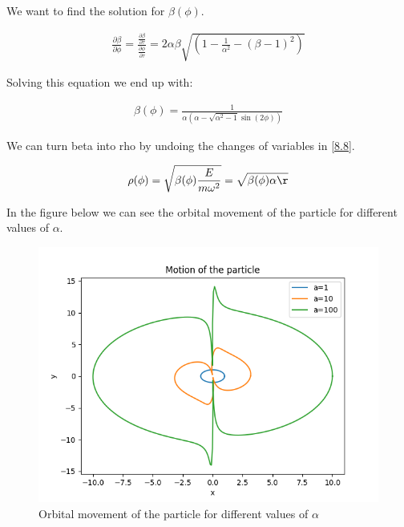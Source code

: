 We want to find the solution for $\beta (\phi)$.

\begin{equation}
  \begin{array}{c}
    \frac{\partial\beta}{\partial\phi} = \frac{\frac{\partial\beta}{\partial\tau}}{\frac{\partial\phi}{\partial\tau}} = 2\alpha\beta\sqrt{\left(1-\frac{1}{\alpha^2}-(\beta-1)^2\right)}
  \end{array}
\end{equation}

Solving this equation we end up with:

\begin{equation}
  \begin{array}{c}
    \beta(\phi) = \frac{1}{\alpha(\alpha-\sqrt{\alpha^2-1}\sin(2\phi))}
  \end{array}
\end{equation}

We can turn beta into rho by undoing the changes of variables in \ref{8.8}.

\begin{equation}
    \rho(\phi) = \sqrt{\beta(\phi)\frac{E}{m\omega^2}} = \sqrt{\beta(\phi)\alpha \r}
\end{equation}

In the figure below we can see the orbital movement of the particle for different values of $\alpha$.

\begin{figure}
  \centering
  \includegraphics{images8/beta_theta.png}
  \caption{Orbital movement of the particle for different values of $\alpha$}
\end{figure}

